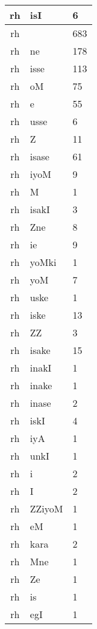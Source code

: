 \documentclass[a4 paper]{article}
\begin{document}
\begin{longtable}{cp{}p{}}
rh & isI & 6\\ \midrule rh &  & 683\\ \midrule rh & ne & 178\\ \midrule rh & isse & 113\\ \midrule rh & oM & 75\\ \midrule rh & e & 55\\ \midrule rh & usse & 6\\ \midrule rh & Z & 11\\ \midrule rh & isase & 61\\ \midrule rh & iyoM & 9\\ \midrule rh & M & 1\\ \midrule rh & isakI & 3\\ \midrule rh & Zne & 8\\ \midrule rh & ie & 9\\ \midrule rh & yoMki & 1\\ \midrule rh & yoM & 7\\ \midrule rh & uske & 1\\ \midrule rh & iske & 13\\ \midrule rh & ZZ & 3\\ \midrule rh & isake & 15\\ \midrule rh & inakI & 1\\ \midrule rh & inake & 1\\ \midrule rh & inase & 2\\ \midrule rh & iskI & 4\\ \midrule rh & iyA & 1\\ \midrule rh & unkI & 1\\ \midrule rh & i & 2\\ \midrule rh & I & 2\\ \midrule rh & ZZiyoM & 1\\ \midrule rh & eM & 1\\ \midrule rh & kara & 2\\ \midrule rh & Mne & 1\\ \midrule rh & Ze & 1\\ \midrule rh & is & 1\\ \midrule rh & egI & 1\\ \midrule 

\end{longtable}
\end{document}
